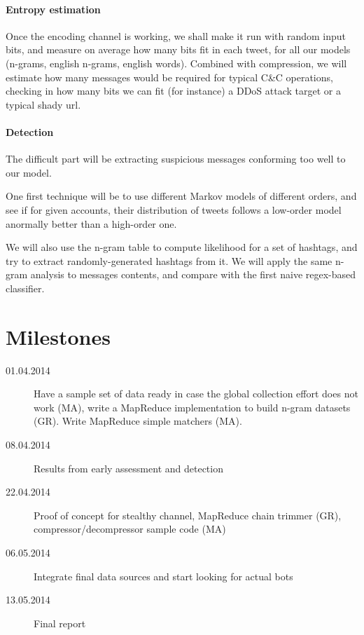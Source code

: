 \documentclass[a4paper,11pt]{article}
\begin{document}
\paragraph{Entropy estimation}

Once the encoding channel is working, we shall make it run with random input bits, and measure on average how many bits fit in each tweet, for all our models (n-grams, english n-grams, english words). Combined with compression, we will estimate how many messages would be required for typical C\&C operations, checking in how many bits we can fit (for instance) a DDoS attack target or a typical shady url.

\paragraph{Detection}

The difficult part will be extracting suspicious messages conforming too well to our model. 

One first technique will be to use different Markov models of different orders, and see if for given accounts, their distribution of tweets follows a low-order model anormally better than a high-order one.

We will also use the n-gram table to compute likelihood for a set of hashtags, and try to extract randomly-generated hashtags from it. We will apply the same n-gram analysis to messages contents, and compare with the first naive regex-based classifier.

\section{Milestones}

\begin{description}
	\item[01.04.2014] Have a sample set of data ready in case the global collection effort does not work (MA), write a MapReduce implementation to build n-gram datasets (GR). Write MapReduce simple matchers (MA).
	\item[08.04.2014] Results from early assessment and detection
	\item[22.04.2014] Proof of concept for stealthy channel, MapReduce chain trimmer (GR), compressor/decompressor sample code (MA)
	\item[06.05.2014] Integrate final data sources and start looking for actual bots
	\item[13.05.2014] Final report 
\end{description}
\end{document}
